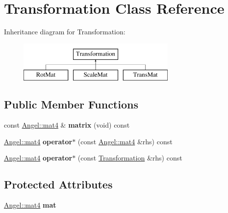 \hypertarget{class_transformation}{\section{Transformation Class Reference}
\label{class_transformation}
}
Inheritance diagram for Transformation\-:\begin{figure}[H]
\begin{center}
\leavevmode
\includegraphics[height=2.000000cm]{class_transformation}
\end{center}
\end{figure}
\subsection*{Public Member Functions}
\begin{DoxyCompactItemize}
\item 
\hypertarget{class_transformation_afcec300424207fc1d20864b73136937e}{const \hyperlink{class_angel_1_1mat4}{Angel\-::mat4} \& {\bfseries matrix} (void) const }\label{class_transformation_afcec300424207fc1d20864b73136937e}

\item 
\hypertarget{class_transformation_afdfbf48815a5b0d885f3b93f04cd2c66}{\hyperlink{class_angel_1_1mat4}{Angel\-::mat4} {\bfseries operator$\ast$} (const \hyperlink{class_angel_1_1mat4}{Angel\-::mat4} \&rhs) const }\label{class_transformation_afdfbf48815a5b0d885f3b93f04cd2c66}

\item 
\hypertarget{class_transformation_a85b923e0066365ef2e4aec3671396410}{\hyperlink{class_angel_1_1mat4}{Angel\-::mat4} {\bfseries operator$\ast$} (const \hyperlink{class_transformation}{Transformation} \&rhs) const }\label{class_transformation_a85b923e0066365ef2e4aec3671396410}

\end{DoxyCompactItemize}
\subsection*{Protected Attributes}
\begin{DoxyCompactItemize}
\item 
\hypertarget{class_transformation_a5f39fb578a1cdf78ca85efbd932d3834}{\hyperlink{class_angel_1_1mat4}{Angel\-::mat4} {\bfseries mat}}\label{class_transformation_a5f39fb578a1cdf78ca85efbd932d3834}

\end{DoxyCompactItemize}


